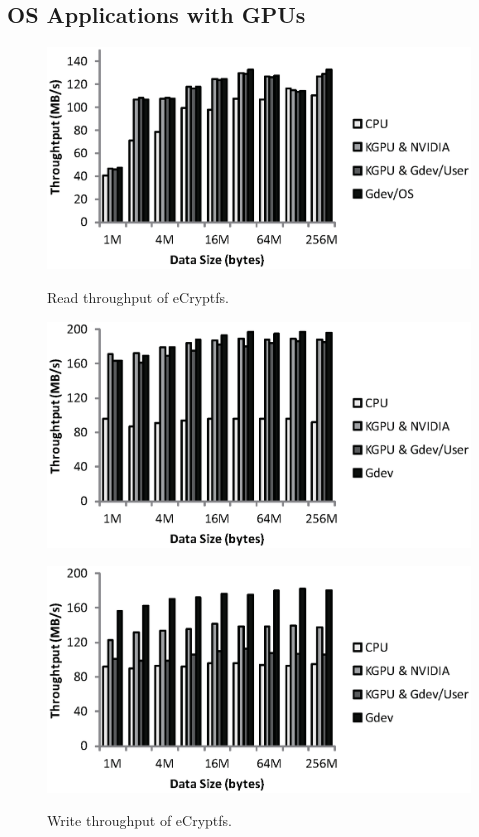 \subsection{OS Applications with GPUs}

\begin{figure}[t]
 \begin{center}
  \includegraphics[width=\hsize]{eps/ecryptfs_read.eps}\\
  \vspace{-1.5em}
  \caption{Read throughput of eCryptfs.}
  \label{fig:ecryptfs_read}
 \end{center}
 \begin{center}
  \includegraphics[width=\hsize]{eps/ecryptfs_write.eps}\\
  \vspace{-1.5em}
  \caption{Write throughput of eCryptfs.}
  \label{fig:ecryptfs_write}
 \end{center}
 \begin{center}
  \includegraphics[width=\hsize]{eps/ecryptfs_write_multitask.eps}\\

\end{center}
\end{figure}
